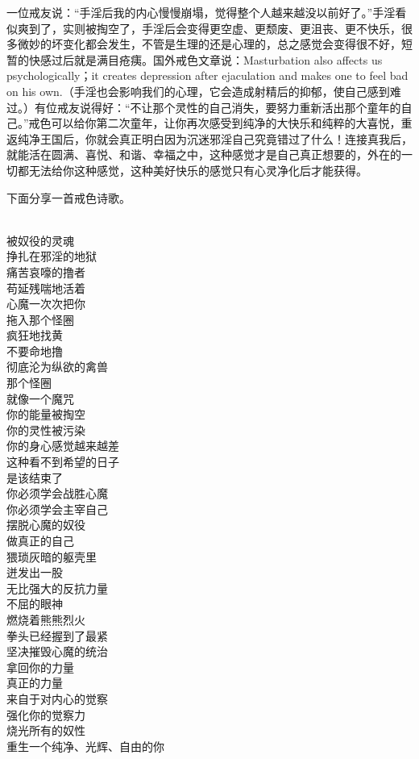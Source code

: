 一位戒友说：“手淫后我的内心慢慢崩塌，觉得整个人越来越没以前好了。”手淫看似爽到了，实则被掏空了，手淫后会变得更空虚、更颓废、更沮丧、更不快乐，很多微妙的坏变化都会发生，不管是生理的还是心理的，总之感觉会变得很不好，短暂的快感过后就是满目疮痍。国外戒色文章说：Masturbation also affects us psychologically；it creates depression after ejaculation and makes one to feel bad on his own.（手淫也会影响我们的心理，它会造成射精后的抑郁，使自己感到难过。）有位戒友说得好：“不让那个灵性的自己消失，要努力重新活出那个童年的自己。”戒色可以给你第二次童年，让你再次感受到纯净的大快乐和纯粹的大喜悦，重返纯净王国后，你就会真正明白因为沉迷邪淫自己究竟错过了什么！连接真我后，就能活在圆满、喜悦、和谐、幸福之中，这种感觉才是自己真正想要的，外在的一切都无法给你这种感觉，这种美好快乐的感觉只有心灵净化后才能获得。

下面分享一首戒色诗歌。

\begin{poem}[拿回你的力量]
    \begin{multicols}{3}
        \begin{center}~\\
            被奴役的灵魂 \\ 挣扎在邪淫的地狱 \\ 痛苦哀嚎的撸者 \\ 苟延残喘地活着 \\ 心魔一次次把你 \\ 拖入那个怪圈 \\ 疯狂地找黄 \\ 不要命地撸 \\ 彻底沦为纵欲的禽兽 \\ 那个怪圈 \\ 就像一个魔咒 \\ 你的能量被掏空 \\ 你的灵性被污染 \\ 你的身心感觉越来越差 \\ 这种看不到希望的日子 \\ 是该结束了 \\ 你必须学会战胜心魔 \\ 你必须学会主宰自己 \\ 摆脱心魔的奴役 \\ 做真正的自己 \\ 猥琐灰暗的躯壳里 \\ 迸发出一股 \\ 无比强大的反抗力量 \\ 不屈的眼神 \\ 燃烧着熊熊烈火 \\ 拳头已经握到了最紧 \\ 坚决摧毁心魔的统治 \\ 拿回你的力量 \\ 真正的力量 \\ 来自于对内心的觉察 \\ 强化你的觉察力 \\ 烧光所有的奴性 \\ 重生一个纯净、光辉、自由的你
        \end{center}
    \end{multicols}
\end{poem}

